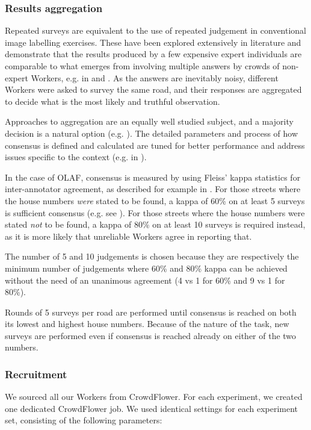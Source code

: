 \subsubsection{Results aggregation}

Repeated surveys are equivalent to the use of repeated judgement in conventional image labelling exercises. These have been explored extensively in literature and demonstrate that the results produced by a few expensive expert individuals are comparable to what emerges from involving multiple answers by crowds of non-expert Workers, e.g. in \cite{Snow:2008wo} and \cite{Sheng:2008gra}. As the answers are inevitably noisy, different Workers were asked to survey the same road, and their responses are aggregated to decide what is the most likely and truthful observation. 
        
Approaches to aggregation are an equally well studied subject, and a majority decision is a natural option (e.g. \cite{Le:2010ug}). The detailed parameters and process of how consensus is defined and calculated are tuned for better performance and address issues specific to the context (e.g. in \cite{Hirth:2011fh}). 

In the case of OLAF, consensus is measured by using Fleiss' kappa statistics for inter-annotator agreement, as described for example in \cite{Nowak:2010gt}. For those streets where the house numbers {\it were} stated to be found, a kappa of 60\% on at least 5 surveys is sufficient consensus (e.g. see \cite{Landis:1977kv}). For those streets where the house numbers were stated {\it not} to be found, a kappa of 80\% on at least 10 surveys is required instead, as it is more likely that unreliable Workers agree in reporting that.

The number of 5 and 10 judgements is chosen because they are respectively the minimum number of judgements where 60\% and 80\% kappa can be achieved without the need of an unanimous agreement (4 vs 1 for 60\% and 9 vs 1 for 80\%). 

Rounds of 5 surveys per road are performed until consensus is reached on both its lowest and highest house numbers. Because of the nature of the task, new surveys are performed even if consensus is reached already on either of the two numbers.  

\subsubsection{Recruitment}

We sourced all our Workers from CrowdFlower. For each experiment, we created one dedicated CrowdFlower job. We used identical settings for each experiment set, consisting of the following parameters:

